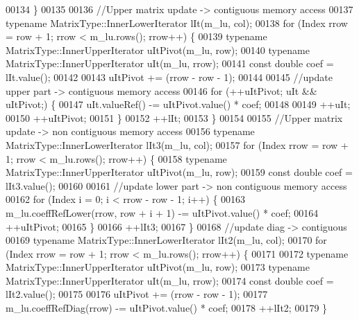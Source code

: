 \begin{DoxyCode}
00134         \}
00135 
00136         \textcolor{comment}{//Upper matrix update -> contiguous memory access}
00137         \textcolor{keyword}{typename} MatrixType::InnerLowerIterator lIt(m\_lu, col);
00138         \textcolor{keywordflow}{for} (Index rrow = row + 1; rrow < m\_lu.rows(); rrow++) \{
00139             \textcolor{keyword}{typename} MatrixType::InnerUpperIterator uItPivot(m\_lu, row);
00140             \textcolor{keyword}{typename} MatrixType::InnerUpperIterator uIt(m\_lu, rrow);
00141             \textcolor{keyword}{const} \textcolor{keywordtype}{double} coef = lIt.value();
00142 
00143             uItPivot += (rrow - row - 1);
00144 
00145             \textcolor{comment}{//update upper part  -> contiguous memory access}
00146             \textcolor{keywordflow}{for} (++uItPivot; uIt && uItPivot;) \{
00147                 uIt.valueRef() -= uItPivot.value() * coef;
00148 
00149                 ++uIt;
00150                 ++uItPivot;
00151             \}
00152             ++lIt;
00153         \}
00154 
00155         \textcolor{comment}{//Upper matrix update -> non contiguous memory access}
00156         \textcolor{keyword}{typename} MatrixType::InnerLowerIterator lIt3(m\_lu, col);
00157         \textcolor{keywordflow}{for} (Index rrow = row + 1; rrow < m\_lu.rows(); rrow++) \{
00158             \textcolor{keyword}{typename} MatrixType::InnerUpperIterator uItPivot(m\_lu, row);
00159             \textcolor{keyword}{const} \textcolor{keywordtype}{double} coef = lIt3.value();
00160 
00161             \textcolor{comment}{//update lower part ->  non contiguous memory access}
00162             \textcolor{keywordflow}{for} (Index i = 0; i < rrow - row - 1; i++) \{
00163                 m\_lu.coeffRefLower(rrow, row + i + 1) -= uItPivot.value() * coef;
00164                 ++uItPivot;
00165             \}
00166             ++lIt3;
00167         \}
00168         \textcolor{comment}{//update diag -> contiguous}
00169         \textcolor{keyword}{typename} MatrixType::InnerLowerIterator lIt2(m\_lu, col);
00170         \textcolor{keywordflow}{for} (Index rrow = row + 1; rrow < m\_lu.rows(); rrow++) \{
00171 
00172             \textcolor{keyword}{typename} MatrixType::InnerUpperIterator uItPivot(m\_lu, row);
00173             \textcolor{keyword}{typename} MatrixType::InnerUpperIterator uIt(m\_lu, rrow);
00174             \textcolor{keyword}{const} \textcolor{keywordtype}{double} coef = lIt2.value();
00175 
00176             uItPivot += (rrow - row - 1);
00177             m\_lu.coeffRefDiag(rrow) -= uItPivot.value() * coef;
00178             ++lIt2;
00179         \}

\end{DoxyCode}
